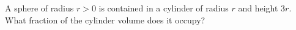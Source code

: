 A sphere of radius $r>0$ is contained in a cylinder of radius $r$ and height $3r$. What fraction of the cylinder volume does it occupy?
